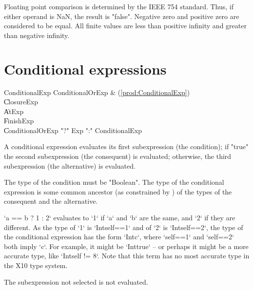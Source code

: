 Floating point comparison is determined by the IEEE 754
standard.  Thus,
if either operand is NaN, the result is \xcd"false".
Negative zero and positive zero are considered to be equal.
All finite values are less than positive infinity and greater
than negative infinity.



\section{Conditional expressions}
\label{Conditional}

\begin{bbgrammar}
      ConditionalExp \: ConditionalOrExp & (\ref{prod:ConditionalExp}) \\
                    \| ClosureExp \\
                    \| AtExp \\
                    \| FinishExp \\
                    \| ConditionalOrExp \xcd"?" Exp \xcd":" ConditionalExp \\
\end{bbgrammar}

A conditional expression evaluates its first subexpression (the
condition); if \xcd"true"
the second subexpression (the consequent) is evaluated; otherwise,
the third subexpression (the alternative) is evaluated.

The type of the condition must be \xcd"Boolean".
The type of the conditional expression is some common 
ancestor (as constrained by ) of the types of the consequent and the
alternative. 

\begin{ex}
\xcd`a == b ? 1 : 2`
evaluates to \xcd`1` if \xcd`a` and \xcd`b` are the same, and \xcd`2` if they
are different.   As the type of \xcd`1` is \xcd`Int{self==1}` and of \xcd`2`
is \xcd`Int{self==2}`, the type of the conditional expression has the form
\xcd`Int{c}`, where \xcd`self==1` and \xcd`self==2` both imply \xcd`c`.  For
example, it might be \xcd`Int{true}` -- or perhaps it might be a more accurate
type, like \xcd`Int{self != 8}`. Note that this term has no most accurate type
in the X10 type system.
\end{ex}

The subexpression not selected is not evaluated.

